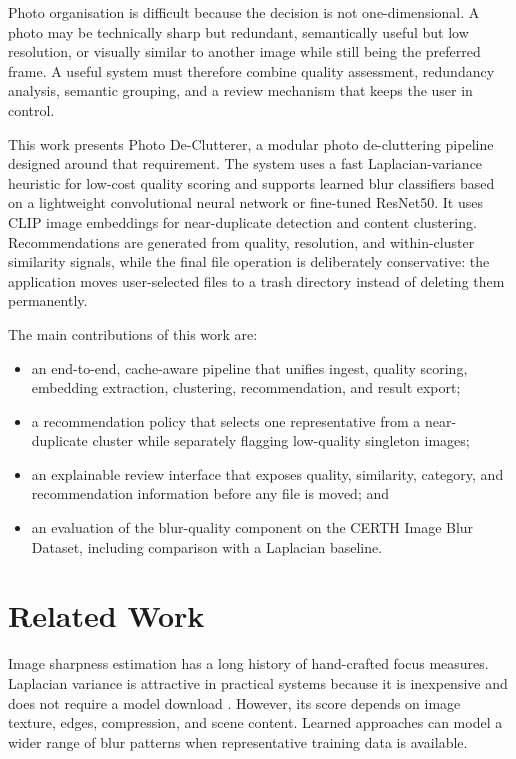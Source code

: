\documentclass[conference]{IEEEtran}
\newcommand{\project}{Photo De-Clutterer}
\begin{document}
Photo organisation is difficult because the decision is not one-dimensional. A photo may be technically sharp but redundant, semantically useful but low resolution, or visually similar to another image while still being the preferred frame. A useful system must therefore combine quality assessment, redundancy analysis, semantic grouping, and a review mechanism that keeps the user in control.

This work presents \project{}, a modular photo de-cluttering pipeline designed around that requirement. The system uses a fast Laplacian-variance heuristic for low-cost quality scoring and supports learned blur classifiers based on a lightweight convolutional neural network or fine-tuned ResNet50. It uses CLIP image embeddings for near-duplicate detection and content clustering. Recommendations are generated from quality, resolution, and within-cluster similarity signals, while the final file operation is deliberately conservative: the application moves user-selected files to a trash directory instead of deleting them permanently.

The main contributions of this work are:
\begin{itemize}
    \item an end-to-end, cache-aware pipeline that unifies ingest, quality scoring, embedding extraction, clustering, recommendation, and result export;
    \item a recommendation policy that selects one representative from a near-duplicate cluster while separately flagging low-quality singleton images;
    \item an explainable review interface that exposes quality, similarity, category, and recommendation information before any file is moved; and
    \item an evaluation of the blur-quality component on the CERTH Image Blur Dataset, including comparison with a Laplacian baseline.
\end{itemize}

\section{Related Work}
Image sharpness estimation has a long history of hand-crafted focus measures. Laplacian variance is attractive in practical systems because it is inexpensive and does not require a model download \cite{pertuz2013focus}. However, its score depends on image texture, edges, compression, and scene content. Learned approaches can model a wider range of blur patterns when representative training data is available.
\end{document}
